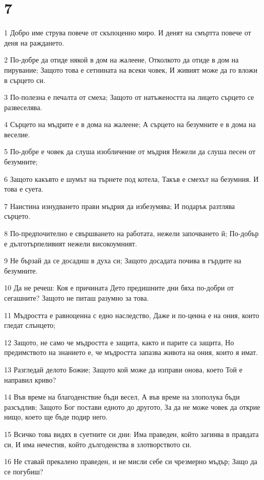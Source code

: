 \chapter{7}

\par 1 Добро  име струва повече от скъпоценно миро. И денят на смъртта повече  от деня на раждането.
\par 2 По-добре да отиде някой в дом на жалеене, Отколкото да отиде в дом на пирувание; Защото това е сетнината на всеки човек, И живият може да го вложи в сърцето си.
\par 3 По-полезна е печалта от смеха; Защото от натъжеността на лицето сърцето се развеселява.
\par 4 Сърцето на мъдрите е в дома на жалеене; А сърцето на безумните е в дома на веселие.
\par 5 По-добре е човек да слуша изобличение от мъдрия Нежели да слуша песен от безумните;
\par 6 Защото какъвто е шумът на търнете под котела, Такъв е смехът на безумния. И това е суета.
\par 7 Наистина изнудването прави мъдрия да избезумява; И подарък разтлява сърцето.
\par 8 По-предпочително е свършването на работата, нежели започването й; По-добър е дълготърпеливият нежели високоумният.
\par 9 Не бързай да се досадиш в духа си; Защото досадата почива в гърдите на безумните.
\par 10 Да не речеш: Коя е причината Дето предишните дни бяха по-добри от сегашните? Защото не питаш разумно за това.
\par 11 Мъдростта е равноценна с едно наследство, Даже и по-ценна е на ония, които гледат слънцето;
\par 12 Защото, не само че мъдростта е защита, както и парите са защита, Но предимството на знанието е, че мъдростта запазва живота на ония, които я имат.
\par 13 Разгледай делото Божие; Защото кой може да изправи онова, което Той е направил криво?
\par 14 Във време на благоденствие бъди весел, А във време на злополука бъди разсъдлив; Защото Бог постави едното до другото, За да не може човек да открие нищо, което ще бъде подир него.
\par 15 Всичко това видях в суетните си дни: Има праведен, който загинва в правдата си, И има нечестив, който дългоденства в злотворството си.
\par 16 Не ставай прекалено праведен, и не мисли себе си чрезмерно мъдър; Защо да се погубиш?
